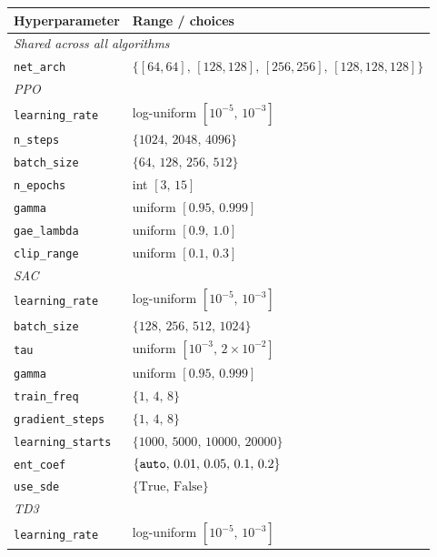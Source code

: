 \begin{table}[H]
  \centering
  \begin{tabular}{|l|l|}
    \hline
    \textbf{Hyperparameter} & \textbf{Range / choices} \\
    \hline
    \multicolumn{2}{|l|}{\textit{Shared across all algorithms}} \\
    \texttt{net\_arch} & $\{[64,64],\,[128,128],\,[256,256],\,[128,128,128]\}$ \\
    \hline
    \multicolumn{2}{|l|}{\textit{PPO}} \\
    \texttt{learning\_rate} & log-uniform $[10^{-5},\,10^{-3}]$ \\
    \texttt{n\_steps}       & $\{1024,\,2048,\,4096\}$ \\
    \texttt{batch\_size}    & $\{64,\,128,\,256,\,512\}$ \\
    \texttt{n\_epochs}      & int $[3,\,15]$ \\
    \texttt{gamma}          & uniform $[0.95,\,0.999]$ \\
    \texttt{gae\_lambda}    & uniform $[0.9,\,1.0]$ \\
    \texttt{clip\_range}    & uniform $[0.1,\,0.3]$ \\
    \hline
    \multicolumn{2}{|l|}{\textit{SAC}} \\
    \texttt{learning\_rate}     & log-uniform $[10^{-5},\,10^{-3}]$ \\
    \texttt{batch\_size}        & $\{128,\,256,\,512,\,1024\}$ \\
    \texttt{tau}                & uniform $[10^{-3},\,2\times10^{-2}]$ \\
    \texttt{gamma}              & uniform $[0.95,\,0.999]$ \\
    \texttt{train\_freq}        & $\{1,\,4,\,8\}$ \\
    \texttt{gradient\_steps}    & $\{1,\,4,\,8\}$ \\
    \texttt{learning\_starts}   & $\{1000,\,5000,\,10000,\,20000\}$ \\
    \texttt{ent\_coef}          & $\{\text{\texttt{auto}},\,0.01,\,0.05,\,0.1,\,0.2\}$ \\
    \texttt{use\_sde}           & $\{\text{True},\,\text{False}\}$ \\
    \hline
    \multicolumn{2}{|l|}{\textit{TD3}} \\
    \texttt{learning\_rate}        & log-uniform $[10^{-5},\,10^{-3}]$ \\

\end{tabular}
\end{table}
